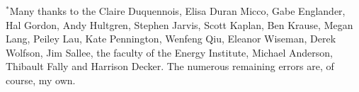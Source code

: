 \documentclass[11pt,letterpaper,oneside]{article}
\begin{document}
\vspace{3in plus 2in minus 1.7in}
{\footnotesize
\noindent
$^*$Many thanks to the Claire Duquennois, Elisa Duran Micco, Gabe Englander, Hal Gordon, Andy Hultgren, Stephen Jarvis, Scott Kaplan, Ben Krause, Megan Lang, Peiley Lau, Kate Pennington, Wenfeng Qiu, Eleanor Wiseman, Derek Wolfson, Jim Sallee, the faculty of the Energy Institute, Michael Anderson, Thibault Fally and Harrison Decker.
The numerous remaining errors are, of course, my own.
}
%
%
%
%
%
\end{document}
